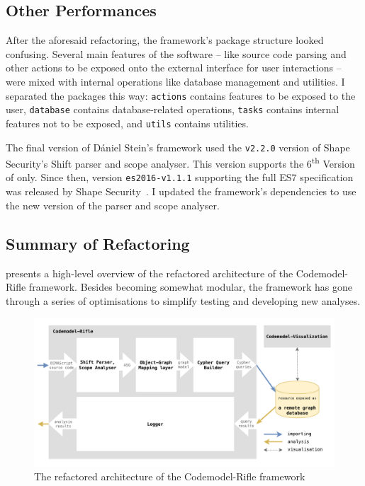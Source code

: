 \subsection{Other Performances}

After the aforesaid refactoring, the framework's package structure looked confusing. Several main features of the software – like source code parsing and other actions to be exposed onto the external interface for user interactions – were mixed with internal operations like database management and utilities. I separated the packages this way: \texttt{actions} contains features to be exposed to the user, \texttt{database} contains database-related operations, \texttt{tasks} contains internal features not to be exposed, and \texttt{utils} contains utilities.

The final version of Dániel Stein's framework used the \texttt{v2.2.0} version of Shape Security's Shift parser and scope analyser. This version supports the 6\textsuperscript{th} Version of \es only. Since then, version \texttt{es2016-v1.1.1} supporting the full ES7 specification was released by Shape Security~\cite{shift-ast, shift-java-github}. I updated the framework's dependencies to use the new version of the parser and scope analyser.

\subsection{Summary of Refactoring}

 presents a high-level overview of the refactored architecture of the Codemodel-Rifle framework. Besides becoming somewhat modular, the framework has gone through a series of optimisations to simplify testing and developing new analyses.

\begin{figure}[!htb]
	\centering
	\includegraphics[width=\textwidth, trim=3mm 3mm 3mm 3mm,clip]{figures/codemodel-rifle-refactored-architecture.pdf}
	\caption{The refactored architecture of the Codemodel-Rifle framework}
	\label{fig:codemodel-rifle-refactored-architecture}
\end{figure}


